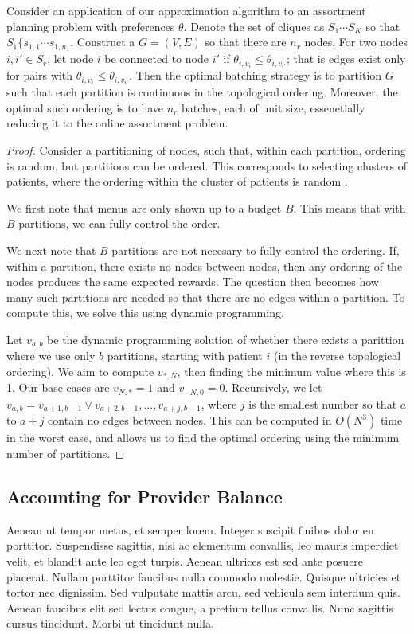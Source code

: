 \begin{lemma}
    Consider an application of our approximation algorithm to an assortment planning problem with preferences $\theta$. 
    Denote the set of cliques as $S_{1} \cdots S_{K}$ so that $S_{1} \{s_{1,1} \cdots s_{1,n_{1}}$. 
    Construct a $G=(V,E)$ so that there are $n_{r}$ nodes. 
    For two nodes $i,i' \in S_{r}$, let node $i$ be connected to node $i'$ if $\theta_{i,v_{i}} \leq \theta_{i,v_{i'}}$; that is edges exist only for pairs with $\theta_{i,v_{i}} \leq \theta_{i,v_{i'}}$. 
    Then the optimal batching strategy is to partition $G$ such that each partition is continuous in the topological ordering. 
    Moreover, the optimal such ordering is to have $n_{r}$ batches, each of unit size, essenetially reducing it to the online assortment problem.
\end{lemma}
\begin{proof}
    Consider a partitioning of nodes, such that, within each partition, ordering is random, but partitions can be ordered. 
    This corresponds to selecting clusters of patients, where the ordering within the cluster of patients is random .

    We first note that menus are only shown up to a budget $B$. 
    This means that with $B$ partitions, we can fully control the order. 

    We next note that $B$ partitions are not necesary to fully control the ordering. 
    If, within a partition, there exists no nodes between nodes, then any ordering of the nodes produces the same expected rewards. 
    The question then becomes how many such partitions are needed so that there are no edges within a partition. 
    To compute this, we solve this using dynamic programming. 

    Let $v_{a,b}$ be the dynamic programming solution of whether there exists a parittion where we use only $b$ partitions, starting with patient $i$ (in the reverse topological ordering). 
    We aim to compute $v_{*,N}$, then finding the minimum value where this is 1.  
    Our base cases are $v_{N,*} = 1$ and $v_{-N,0} = 0$. 
    Recursively, we let $v_{a,b} = v_{a+1,b-1} \lor v_{a+2,b-1},\ldots,v_{a+j,b-1}$, where $j$ is the smallest number so that $a$ to $a+j$ contain no edges between nodes. 
    This can be computed in $O(N^{3})$ time in the worst case, and allows us to find the optimal ordering using the minimum number of partitions. 
\end{proof}

 \subsection{Accounting for Provider Balance}
 Aenean ut tempor metus, et semper lorem. Integer suscipit finibus dolor eu porttitor. Suspendisse sagittis, nisl ac elementum convallis, leo mauris imperdiet velit, et blandit ante leo eget turpis. Aenean ultrices est sed ante posuere placerat. Nullam porttitor faucibus nulla commodo molestie. Quisque ultricies et tortor nec dignissim. Sed vulputate mattis arcu, sed vehicula sem interdum quis. Aenean faucibus elit sed lectus congue, a pretium tellus convallis. Nunc sagittis cursus tincidunt. Morbi ut tincidunt nulla.

